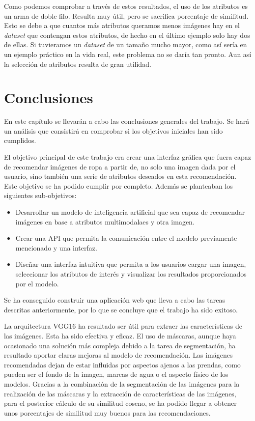 \documentclass[12pt]{report} %
\begin{document}
	Como podemos comprobar a través de estos resultados, el uso de los atributos es un arma de doble filo. Resulta muy útil, pero se sacrifica porcentaje de similitud.
	Esto se debe a que cuantos más atributos queramos menos imágenes hay en el \textit{dataset} que contengan estos atributos, de hecho en el último ejemplo
	solo hay dos de ellas. Si tuvieramos un \textit{dataset} de un tamaño mucho mayor, como así sería en un ejemplo práctico en la vida real, este problema no se daría
	tan pronto. Aun así la selección de atributos resulta de gran utilidad.

	\chapter{Conclusiones}

	En este capítulo se llevarán a cabo las conclusiones generales del trabajo.
	Se hará un análisis que consistirá en comprobar si los objetivos iniciales han sido cumplidos.

	El objetivo principal de este trabajo era crear una interfaz gráfica que fuera capaz de recomendar imágenes de ropa
	a partir de, no solo una imagen dada por el usuario, sino también una serie de atributos deseados en esta recomendación.
	Este objetivo se ha podido cumplir por completo. Además se planteaban los siguientes sub-objetivos:
	\begin{itemize}
		\item Desarrollar un modelo de inteligencia artificial que sea capaz de recomendar imágenes en base a atributos multimodalaes y otra imagen.
		\item Crear una API que permita la comunicación entre el modelo previamente mencionado y una interfaz.
		\item Diseñar una interfaz intuitiva que permita a los usuarios cargar una imagen, seleccionar los atributos de interés y visualizar los resultados proporcionados por el modelo.
	\end{itemize}
	Se ha conseguido construir una aplicación web que lleva a cabo las tareas descritas anteriormente, por lo que se concluye que el trabajo
	ha sido exitoso. 

	La arquitectura VGG16 ha resultado ser útil para extraer las características de las imágenes. Esta ha sido efectiva y eficaz.
	El uso de máscaras, aunque haya ocasionado una solución más compleja debido a la tarea de segmentación, ha resultado aportar
	claras mejoras al modelo de recomendación. Las imágenes recomendadas dejan de estar influidas por aspectos ajenos a las prendas,
	como pueden ser el fondo de la imagen, marcas de agua o el aspecto físico de los modelos. Gracias a la combinación de la segmentación
	de las imágenes para la realización de las máscaras y la extracción de características de las imágenes, para el posterior cálculo de
	su similitud coseno, se ha podido llegar a obtener unos porcentajes de similitud muy buenos para las recomendaciones.
\end{document}
